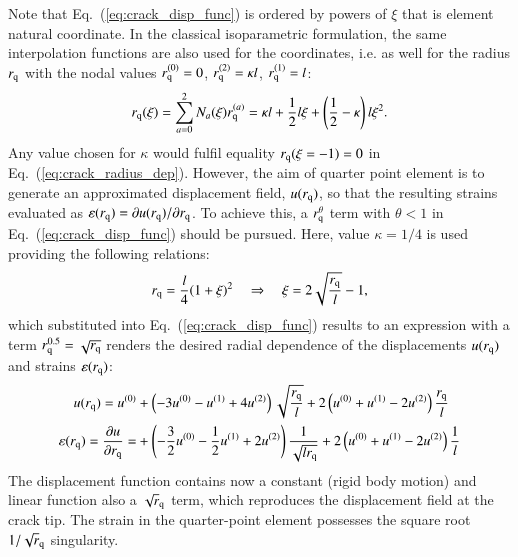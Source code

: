 \documentclass[11pt]{acmeArticle}
\numberwithin{equation}{section}
\begin{document}
Note that Eq.~(\ref{eq:crack_disp_func}) is ordered by powers of $\xi$ that is element natural coordinate. 
In the classical isoparametric formulation, the same interpolation functions are also used for the coordinates, i.e. as well for the radius $r_{\rm q}$ with the nodal values $r^{(0)}_{\rm q} = 0$, $r^{(2)}_{\rm q} = \kappa l$, $r^{(1)}_{\rm q} = l$:
\begin{equation}\label{eq:crack_radius_dep}
r_{\rm q}(\xi) = \sum_{a=0}^2 N_a (\xi) r^{(a)}_{\rm q} = \kappa l + \frac{1}{2} l \xi  + \left(  \frac{1}{2} - \kappa \right) l \xi^2.
\end{equation}
Any value chosen for $\kappa$ would fulfil equality $r_{\rm q}(\xi=-1) = 0$ in Eq.~(\ref{eq:crack_radius_dep}).
However, the aim of quarter point element is to generate an approximated displacement field, $u(r_{\rm q})$, so that the resulting strains evaluated as $\varepsilon (r_{\rm q}) = \partial u(r_{\rm q})/\partial r_{\rm q}$.
To achieve this, a $r^{\theta}_{\rm q}$ term with $\theta < 1$ in Eq.~(\ref{eq:crack_disp_func}) should be pursued.
Here, value $\kappa = 1/4$ is used providing the following relations:
\begin{equation}
r_{\rm q}= \frac{l}{4}(1+\xi)^2 \quad \Rightarrow \quad \xi = 2 \sqrt{\frac{r_{\rm q}}{l}} -1,
\end{equation}
which substituted into Eq.~(\ref{eq:crack_disp_func}) results to an expression with a term $r^{0.5}_{\rm q}= \sqrt{r_{\rm q}}$ renders the desired radial dependence of the displacements $u(r_{\rm q})$ and strains $\varepsilon(r_{\rm q})$:
\begin{equation}
\begin{aligned}
u(r_{\rm q}) = u^{(0)} &+ \left( -3u^{(0)} - u^{(1)} +4u^{(2)} \right) \sqrt{\frac{r_{\rm q}}{l}} + 2 \left( u^{(0)} + u^{(1)} -2 u^{(2)} \right) \frac{r_{\rm q}}{l}\\
\varepsilon(r_{\rm q}) = \frac{\partial u}{ \partial r_{\rm q}} = &+ \left( - \frac{3}{2}u^{(0)} - \frac{1}{2}u^{(1)} +2u^{(2)} \right) \frac{1}{\sqrt{lr_{\rm q}}} + 2 \left( u^{(0)} + u^{(1)} -2 u^{(2)} \right) \frac{1}{l}
\end{aligned}
\end{equation}
The displacement function contains now a constant (rigid body motion) and linear function also a $\sqrt r_{\rm q}$ term, which reproduces the displacement field at the crack tip. 
The strain in the quarter-point element possesses the square root $1/{\sqrt r_{\rm q}}$ singularity.
\end{document}
